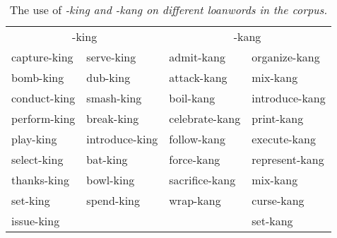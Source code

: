 \begin{table} 
\begin{center}
\begin{tabular}{ll|ll}
\multicolumn{2}{c}{-king}&\multicolumn{2}{c}{-kang}\\
capture-king 	& serve-king   	& admit-kang 	& organize-kang \\
bomb-king 	& dub-king 	& attack-kang 	& mix-kang 	\\
conduct-king 	& smash-king 	& boil-kang 	& introduce-kang \\
perform-king 	& break-king 	& celebrate-kang & print-kang   \\
play-king 	& introduce-king & follow-kang 	& execute-kang \\
select-king 	& bat-king 	&  force-kang  	& represent-kang \\
thanks-king 	& bowl-king 	& sacrifice-kang & mix-kang 	\\
set-king 	& spend-king 	& wrap-kang 	& curse-kang 	\\
issue-king 	&    		&  	 	&  set-kang	\\
\end{tabular}
\end{center}
\caption{The use of \em -king \em and \em -kang \em on different loanwords in the corpus.}
\label{tab:form:kingkang:loan}
\end{table}







% 
% 





